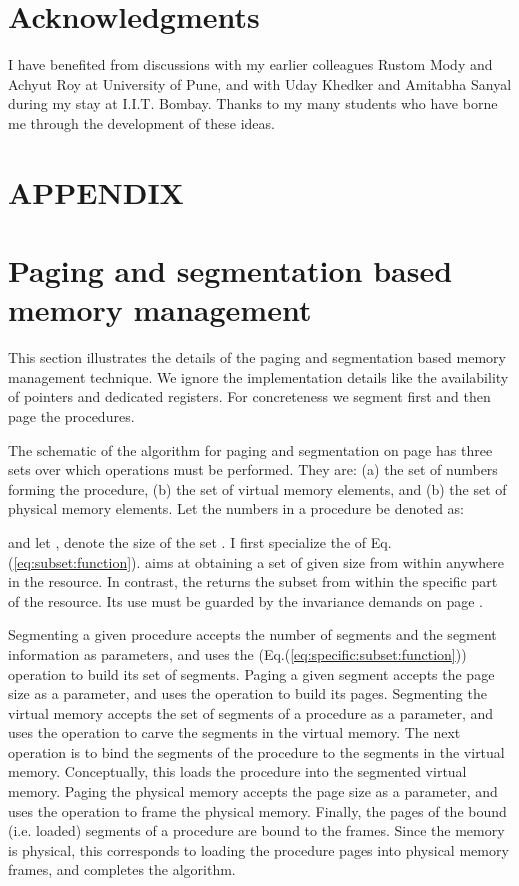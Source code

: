 \documentclass[draft]{article}
\begin{document}
\section*{Acknowledgments}
\label{ack}
I have  benefited from discussions  with my earlier  colleagues Rustom
Mody and Achyut  Roy at University of Pune, and  with Uday Khedker and
Amitabha Sanyal during  my stay at I.I.T.  Bombay.   Thanks to my many
students who have borne me through the development of these ideas.




\appendix

\section*{APPENDIX}
\section{Paging and segmentation based memory management}
\label{sec:mm:with:page:segment}

This section  illustrates the details  of the paging  and segmentation
based  memory  management  technique.   We ignore  the  implementation
details  like the  availability of  pointers and  dedicated registers.
For concreteness we segment first and then page the procedures.

The schematic  of the  algorithm for paging  and segmentation  on page
\pageref{paging:algo:schematic} has  three sets over  which operations
must  be performed.   They are:  (a) the  set of  numbers  forming the
procedure, (b) the set of virtual  memory elements, and (b) the set of
physical memory elements.  Let the numbers  in a procedure 
be denoted as:

and let , denote the size of the set .  I first
specialize the   of Eq.(\ref{eq:subset:function}).  
aims at  obtaining a  set of  given size from  within anywhere  in the
resource.   In contrast,  the   returns  the subset  from
within the specific part of the  resource.  Its use must be guarded by
the invariance demands on page \pageref{eq:total:size:invariance}.


Segmenting a  given procedure   accepts the number of  segments and
the  segment information  as  parameters, and  uses the  
(Eq.(\ref{eq:specific:subset:function})) operation to build its set of
segments.   Paging a  given segment   accepts  the page  size  as a
parameter, and  uses the   operation to build  its pages.
Segmenting the  virtual memory  accepts the  set of segments
of a  procedure as  a parameter, and  uses the   operation to
carve the  segments in the virtual  memory.  The next  operation is to
bind  the segments of  the procedure  to the  segments in  the virtual
memory.   Conceptually, this  loads the  procedure into  the segmented
virtual memory.  Paging the physical  memory  accepts the page size
as a parameter, and uses the  operation to frame the physical
memory.  Finally, the pages of  the bound (i.e.  loaded) segments of a
procedure are bound to the frames.  Since the memory is physical, this
corresponds  to  loading  the  procedure pages  into  physical  memory
frames, and completes the algorithm.
\end{document}
